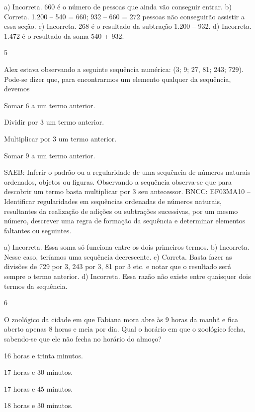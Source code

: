 {\begin{escolha}
{a) Incorreta. 660 é o número de pessoas que ainda vão conseguir entrar.
b) Correta. 1.200 -- 540 = 660; 932 -- 660 = 272 pessoas não conseguirão assistir a essa seção.
c) Incorreta. 268 é o resultado da subtração 1.200 -- 932.
d) Incorreta. 1.472 é o resultado da soma 540 + 932.

\num{5}

Alex estava observando a seguinte sequência numérica: (3; 9; 27, 81; 243; 729).
Pode-se dizer que, para encontrarmos um elemento qualquer da sequência, devemos 

\begin{escolha}
\item
  Somar 6 a um termo anterior.
\item
  Dividir por 3 um termo anterior.
\item
  Multiplicar por 3 um termo anterior.
\item
  Somar 9 a um termo anterior.
\end{escolha}

SAEB: Inferir o padrão ou a regularidade de uma sequência de números naturais ordenados, objetos ou figuras. Observando a sequência observa-se que para descobrir um termo basta multiplicar por 3 seu antecessor.
BNCC: EF03MA10 -- Identificar regularidades em sequências ordenadas de números naturais,
resultantes da realização de adições ou subtrações sucessivas, por um mesmo número,
descrever uma regra de formação da sequência e determinar elementos faltantes ou seguintes.

a) Incorreta. Essa soma só funciona entre os dois primeiros termos.
b) Incorreta. Nesse caso, teríamos uma sequência decrescente.
c) Correta. Basta fazer as divisões de 729 por 3, 243 por 3, 81 por 3 etc. e notar que o resultado será sempre o termo anterior.
d) Incorreta. Essa razão não existe entre quaisquer dois termos da sequência.

\num{6}

O zoológico da cidade em que Fabiana mora abre às 9 horas da manhã e fica aberto apenas 8 horas e meia por dia. Qual o horário em que o zoológico fecha, sabendo-se que ele não fecha no horário do almoço?

\begin{escolha}
\item
  16 horas e trinta minutos.
\item
  17 horas e 30 minutos.
\item
  17 horas e 45 minutos.
\item
  18 horas e 30 minutos.
\end{escolha}

}
\end{escolha}}
